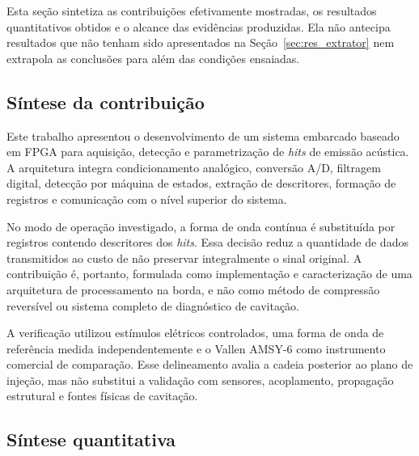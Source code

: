 
Esta seção sintetiza as contribuições efetivamente mostradas, os resultados quantitativos obtidos e o alcance das evidências produzidas. Ela não antecipa resultados que não tenham sido apresentados na Seção~\ref{sec:res_extrator} nem extrapola as conclusões para além das condições ensaiadas.

\subsection{Síntese da contribuição}
\label{v2:subsec:sintese_contribuicao_conclusao}

Este trabalho apresentou o desenvolvimento de um sistema embarcado baseado em FPGA para aquisição, detecção e parametrização de \textit{hits} de emissão acústica. A arquitetura integra condicionamento analógico, conversão A/D, filtragem digital, detecção por máquina de estados, extração de descritores, formação de registros e comunicação com o nível superior do sistema.

No modo de operação investigado, a forma de onda contínua é substituída por registros contendo descritores dos \textit{hits}. Essa decisão reduz a quantidade de dados transmitidos ao custo de não preservar integralmente o sinal original. A contribuição é, portanto, formulada como implementação e caracterização de uma arquitetura de processamento na borda, e não como método de compressão reversível ou sistema completo de diagnóstico de cavitação.

A verificação utilizou estímulos elétricos controlados, uma forma de onda de referência medida independentemente e o Vallen AMSY-6 como instrumento comercial de comparação. Esse delineamento avalia a cadeia posterior ao plano de injeção, mas não substitui a validação com sensores, acoplamento, propagação estrutural e fontes físicas de cavitação.

\subsection{Síntese quantitativa}
\label{v2:subsec:sintese_quantitativa_conclusao}

